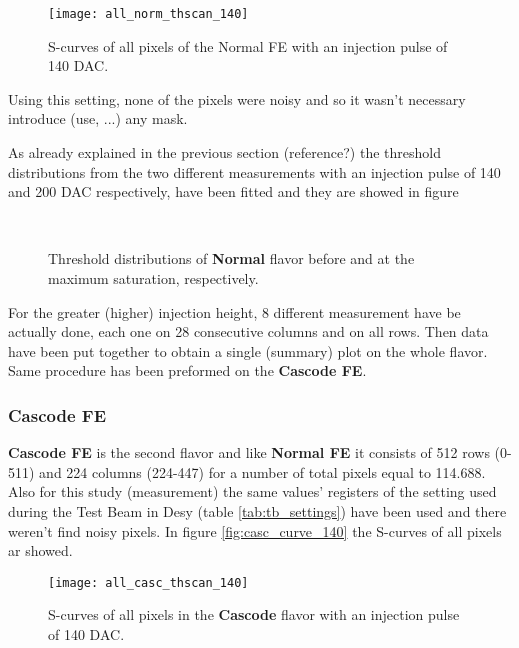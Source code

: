 \begin{figure}[h!]
\centering
\texttt{[image: all\_norm\_thscan\_140]}
\caption{S-curves of all pixels of the Normal FE with an injection pulse of 140 DAC.}
\label{fig:norm_scurve_140}
\end{figure}

Using this setting, none of the pixels were noisy and so it wasn't necessary introduce (use, ...) any mask.

As already explained in the previous section (reference?) the threshold distributions from the two different measurements with an injection pulse of 140 and 200 DAC respectively, have been fitted and they are showed in figure \pageref{fig:thdist_norm}

\begin{figure}[h!]
\centering
{}\quad
{}\\
\caption{Threshold distributions of \textbf{Normal} flavor before and at the maximum saturation, respectively.}
\label{fig:thdist_norm}
\end{figure}
 
For the greater (higher) injection height, 8 different measurement have be actually done, each one on 28 consecutive columns and on all rows. Then data have been put together to obtain a single (summary) plot on the whole flavor. Same procedure has been preformed on the \textbf{Cascode FE}.


\subsubsection{Cascode FE}

\textbf{Cascode FE} is the second flavor and like \textbf{Normal FE} it consists of 512 rows (0-511) and 224 columns (224-447) for a number of total pixels equal to 114.688. Also for this study (measurement) the same values' registers of the setting used during the Test Beam in Desy (table \vref{tab:tb_settings}) have been used and there weren't find noisy pixels. 
In figure \vref{fig:casc_curve_140} the S-curves of all pixels ar showed.

\begin{figure}[h!]
\centering
\texttt{[image: all\_casc\_thscan\_140]}
\caption{S-curves of all pixels in the \textbf{Cascode} flavor with an injection pulse of 140 DAC.}
\label{fig:casc_scurve_140}
\end{figure}

